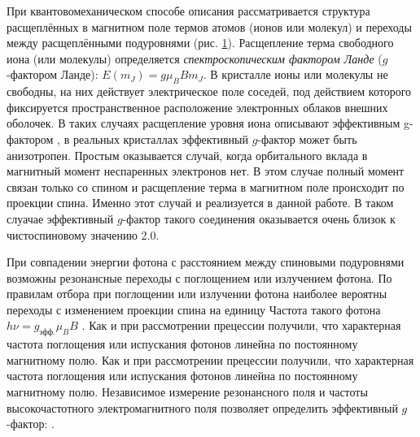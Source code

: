 \documentclass[a4paper,12pt]{article}
\begin{document}
При квантовомеханическом способе описания рассматривается структура расщеплённых в
магнитном поле термов атомов (ионов или молекул) и переходы между расщеплёнными подуровнями (рис. \hyperref[fig: Zeeman effect]{1}). Расщепление терма свободного иона (или молекулы) определяется \textit{спектроскопическим фактором Ланде} ($g$-фактором Ланде): $E(m_J)=g \mu_B B m_J$. В кристалле ионы или молекулы не свободны, на них действует электрическое поле соседей, под действием которого фиксируется пространственное расположение электронных облаков внешних оболочек. В таких случаях расщепление уровня иона описывают эффективным g-фактором , в реальных кристаллах эффективный $g$-фактор может быть анизотропен. Простым оказывается случай, когда орбитального вклада в магнитный момент неспаренных электронов нет. В этом случае полный момент связан только со спином и расщепление терма в магнитном поле происходит по проекции спина. Именно этот случай и реализуется в данной работе. В таком слуачае эффективный $g$-фактор такого соединения оказывается очень близок к чистоспиновому значению 2.0.

При совпадении энергии фотона с расстоянием между спиновыми подуровнями возможны резонансные переходы с поглощением или излучением фотона. По правилам отбора при поглощении или излучении фотона наиболее вероятны переходы с изменением проекции спина на единицу Частота такого фотона $h\nu = g_\text{эфф.} \mu_B B$ . Как и при рассмотрении прецессии получили, что характерная частота поглощения или испускания фотонов линейна по постоянному магнитному полю. Как и при рассмотрении прецессии получили, что характерная частота поглощения или испускания фотонов линейна по постоянному магнитному полю. Независимое измерение резонансного поля и частоты высокочастотного электромагнитного поля позволяет определить эффективный $g$-фактор: .
\end{document}
